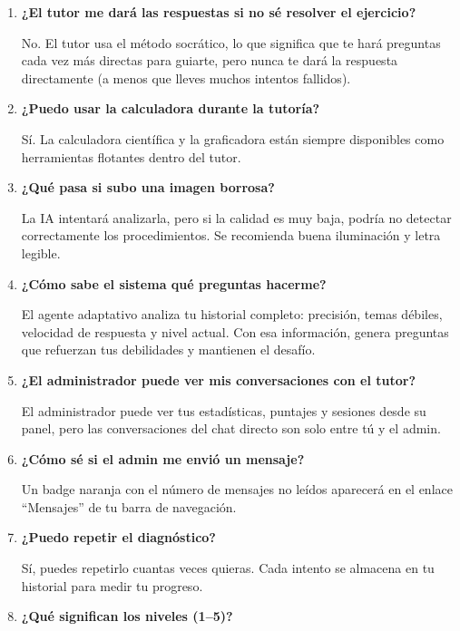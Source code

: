 \documentclass[12pt, a4paper, oneside]{book}
\begin{document}
\begin{enumerate}[leftmargin=2em, label=\textcolor{yt-orange}{\textbf{Q\arabic*.}}]

    \item \textbf{¿El tutor me dará las respuestas si no sé resolver el ejercicio?}

    No. El tutor usa el método socrático, lo que significa que te hará preguntas cada vez más directas para guiarte, pero nunca te dará la respuesta directamente (a menos que lleves muchos intentos fallidos).

    \item \textbf{¿Puedo usar la calculadora durante la tutoría?}

    Sí. La calculadora científica y la graficadora están siempre disponibles como herramientas flotantes dentro del tutor.

    \item \textbf{¿Qué pasa si subo una imagen borrosa?}

    La IA intentará analizarla, pero si la calidad es muy baja, podría no detectar correctamente los procedimientos. Se recomienda buena iluminación y letra legible.

    \item \textbf{¿Cómo sabe el sistema qué preguntas hacerme?}

    El agente adaptativo analiza tu historial completo: precisión, temas débiles, velocidad de respuesta y nivel actual. Con esa información, genera preguntas que refuerzan tus debilidades y mantienen el desafío.

    \item \textbf{¿El administrador puede ver mis conversaciones con el tutor?}

    El administrador puede ver tus estadísticas, puntajes y sesiones desde su panel, pero las conversaciones del chat directo son solo entre tú y el admin.

    \item \textbf{¿Cómo sé si el admin me envió un mensaje?}

    Un badge naranja con el número de mensajes no leídos aparecerá en el enlace ``Mensajes'' de tu barra de navegación.

    \item \textbf{¿Puedo repetir el diagnóstico?}

    Sí, puedes repetirlo cuantas veces quieras. Cada intento se almacena en tu historial para medir tu progreso.

    \item \textbf{¿Qué significan los niveles (1--5)?}


\end{enumerate}
\end{document}
